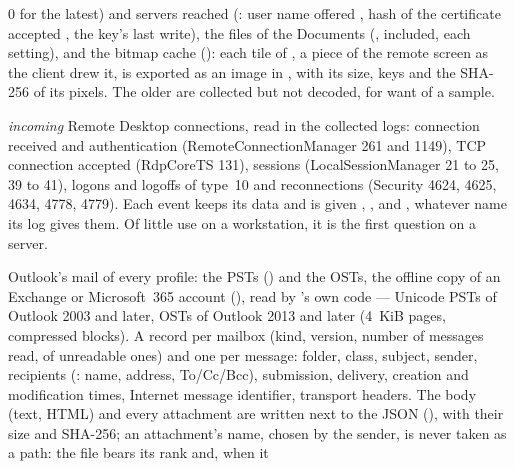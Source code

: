 \documentclass[11pt,a4paper,oneside]{report}
\begin{document}
\begin{description}[style=nextline,leftmargin=1.2em]
         0 for the latest) and servers reached
        (: user name offered , hash of the
        certificate accepted , the key's last write), the
         files of the Documents (,
         included, each setting), and the bitmap cache
        (): each tile of , a piece of the
        remote screen as the client drew it, is exported as an image in
        , with its
        size, keys and the SHA-256 of its pixels. The older
         are collected but not decoded, for want of a
        sample.
  \item[\fichier{rdp\_server.json}] \emph{incoming} Remote Desktop connections,
        read in the collected logs: connection received and authentication
        (RemoteConnectionManager 261 and 1149), TCP connection accepted
        (RdpCoreTS 131), sessions (LocalSessionManager 21 to 25, 39 to 41), logons
        and logoffs of type~10 and reconnections (Security 4624, 4625, 4634,
        4778, 4779). Each event keeps its data and is given ,
        ,  and , whatever
        name its log gives them. Of little use on a workstation, it is the
        first question on a server.
  \item[\fichier{emails.json}] Outlook's mail of every profile: the PSTs
        () and the OSTs, the
        offline copy of an Exchange or Microsoft~365 account
        (),
        read by \wac{}'s own code — Unicode PSTs of Outlook 2003 and later,
        OSTs of Outlook 2013 and later (4~KiB pages, compressed blocks). A
        record per mailbox (kind, version, number of messages read, of
        unreadable ones) and one per message: folder, class, subject, sender,
        recipients (: name, address, To/Cc/Bcc), submission,
        delivery, creation and modification times, Internet message
        identifier, transport headers. The body (text, HTML) and every
        attachment are written next to the JSON
        (),
        with their size and SHA-256; an attachment's name, chosen by the
        sender, is never taken as a path: the file bears its rank and, when it

\end{description}
\end{document}
